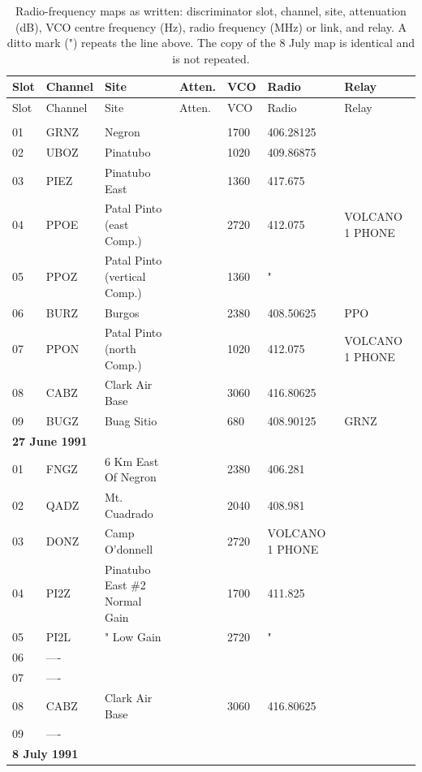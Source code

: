 {\footnotesize
\setlength{\tabcolsep}{3pt}
\begin{longtable}{lllllll}
\caption{Radio-frequency maps as written: discriminator slot, channel, site, attenuation (dB), VCO centre frequency (Hz), radio frequency (MHz) or link, and relay. A ditto mark (") repeats the line above. The  copy of the 8 July map is identical and is not repeated.}\label{tab:radio}\\
\toprule
Slot & Channel & Site & Atten. & VCO & Radio & Relay\\
\midrule\endfirsthead
\toprule
Slot & Channel & Site & Atten. & VCO & Radio & Relay\\
\midrule\endhead
\bottomrule\endfoot
\multicolumn{7}{l}{\textbf{14 May 1991}}\\
01 & GRNZ & Negron &  & 1700 & 406.28125 & \\
02 & UBOZ & Pinatubo &  & 1020 & 409.86875 & \\
03 & PIEZ & Pinatubo East &  & 1360 & 417.675 & \\
04 & PPOE & Patal Pinto (east Comp.) &  & 2720 & 412.075 & VOLCANO 1 PHONE\\
05 & PPOZ & Patal Pinto (vertical Comp.) &  & 1360 & " & \\
06 & BURZ & Burgos &  & 2380 & 408.50625 & PPO\\
07 & PPON & Patal Pinto (north Comp.) &  & 1020 & 412.075 & VOLCANO 1 PHONE\\
08 & CABZ & Clark Air Base &  & 3060 & 416.80625 & \\
09 & BUGZ & Buag Sitio &  & 680 & 408.90125 & GRNZ\\
\multicolumn{7}{l}{\textbf{27 June 1991}}\\
01 & FNGZ & 6 Km East Of Negron &  & 2380 & 406.281 & \\
02 & QADZ & Mt. Cuadrado &  & 2040 & 408.981 & \\
03 & DONZ & Camp O'donnell &  & 2720 & VOLCANO 1 PHONE & \\
04 & PI2Z & Pinatubo East \#2 Normal Gain &  & 1700 & 411.825 & \\
05 & PI2L & " Low Gain &  & 2720 & " & \\
06 & ---- &  &  &  &  & \\
07 & ---- &  &  &  &  & \\
08 & CABZ & Clark Air Base &  & 3060 & 416.80625 & \\
09 & ---- &  &  &  &  & \\
\multicolumn{7}{l}{\textbf{8 July 1991}}\\

\end{longtable}}
